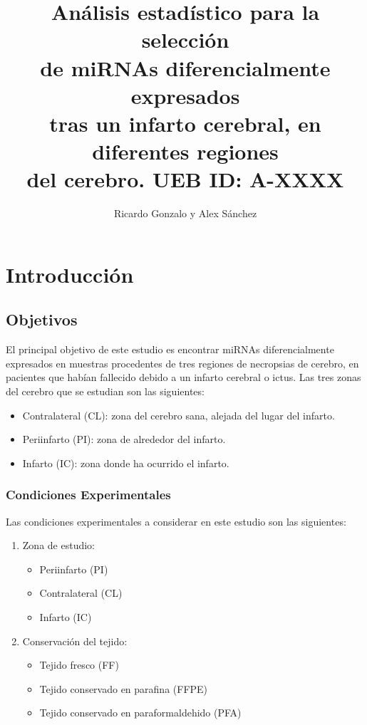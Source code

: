 \documentclass[a4paper]{article}\usepackage[]{graphicx}\usepackage[]{color}
\title{An\'alisis estad\'istico para la selecci\'on \\ 
       de miRNAs diferencialmente expresados \\ 
       tras un infarto cerebral, en diferentes regiones \\
       del cerebro. UEB ID: A-XXXX}
\author{Ricardo Gonzalo y Alex Sánchez}
\begin{document}

\maketitle
\newpage
\tableofcontents
\newpage
\section{Introducci\'on}

\subsection{Objetivos}

El principal objetivo de este estudio es encontrar miRNAs diferencialmente expresados en muestras procedentes de tres regiones de necropsias de cerebro, en pacientes que habían fallecido debido a un infarto cerebral o ictus. Las tres zonas del cerebro que se estudian son las siguientes:
\begin {itemize}
  \item Contralateral (CL): zona del cerebro sana, alejada del lugar del infarto.
  \item Periinfarto (PI): zona de alrededor del infarto.
  \item Infarto (IC): zona donde ha ocurrido el infarto.
\end {itemize}

\subsubsection{Condiciones Experimentales}
Las condiciones experimentales a considerar en este estudio son las siguientes:
\begin{enumerate}
  \item Zona de estudio:
    \begin{itemize}
      \item Periinfarto (PI)
      \item Contralateral (CL)
      \item Infarto (IC)
    \end{itemize}
  \item Conservación del tejido:
    \begin{itemize}
      \item Tejido fresco (FF)
      \item Tejido conservado en parafina (FFPE)
      \item Tejido conservado en paraformaldehido (PFA)
    \end{itemize}
\end{enumerate}
\end{document}
